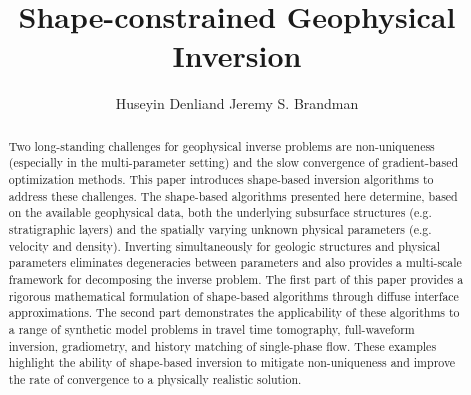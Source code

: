 \documentclass[manuscript,revised]{geophysics}
\begin{document}
\title{Shape-constrained Geophysical Inversion}

\renewcommand{\thefootnote}{\fnsymbol{footnote}} 

\address{
\footnotemark[1] ExxonMobil Research \& Engineering Company, \\
1545 Route 22E, Annandale, NJ 08801}
\author{Huseyin Denli\footnotemark[1] and Jeremy S. Brandman\footnotemark[1]}

\maketitle

\begin{abstract}
Two long-standing challenges for geophysical inverse problems are non-uniqueness (especially in the multi-parameter setting) and the slow convergence of gradient-based optimization methods.  This paper introduces shape-based inversion algorithms to address these challenges.  The shape-based algorithms presented here determine, based on the available geophysical data, both the underlying subsurface structures (e.g. stratigraphic layers) and the spatially varying unknown physical parameters (e.g. velocity and density).  Inverting simultaneously for geologic structures and physical parameters eliminates degeneracies between parameters and also provides a multi-scale framework for decomposing the inverse problem.  The first part of this paper provides a rigorous mathematical formulation of shape-based algorithms through diffuse interface approximations.  The second part demonstrates the applicability of these algorithms to a range of synthetic model problems in travel time tomography, full-waveform inversion, gradiometry, and history matching of single-phase flow.  These examples highlight the ability of shape-based inversion to mitigate non-uniqueness and improve the rate of convergence to a physically realistic solution.    
\end{abstract}
\end{document}

